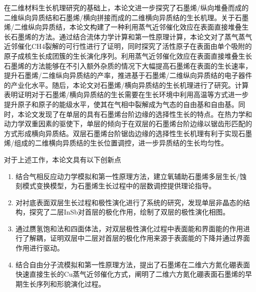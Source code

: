 在二维材料生长机理研究的基础上，本论文进一步探究了石墨烯/纵向堆叠而成的二维纵向异质结和石墨烯/横向拼接而成的二维横向异质结的生长机理。关于石墨烯/二维纵向异质结，本论文构建了一种利用蒸气近邻催化效应在表面直接堆叠生长石墨烯的方法。通过结合流体力学计算和第一性原理计算，本论文对了蒸气蒸气近邻催化CH4裂解的可行性进行了证明，同时探究了活性原子在表面由单个吸附的原子成核生长成团簇的生长演化序列。利用蒸气近邻催化效应在表面直接堆叠生长石墨烯的方法能够在不引入额外杂质的情况下大幅提高石墨烯在表面的生长速率，提升石墨烯/二维纵向异质结的产率，推进基于石墨烯/二维纵向异质结的电子器件的产业化水平。随后，本论文对石墨烯/横向异质结的生长机理进行了研究。计算表明证明对于石墨烯/横向异质结的生长需要在生长环境中利用高温等方式进一步提升原子和原子的能级水平，使其在气相中裂解成为气态的自由基和自由基。同时，本论文发现了在单层的具有石墨烯台阶边缘的选择性生长的特点。在热力学和动力学双重因素的驱使下，单层的倾向于在双层的石墨烯台阶边缘以锯齿形匹配的方式形成横向异质结。双层石墨烯台阶锯齿边缘的选择性生长机理有利于实现石墨烯/组成的二维横向异质结的生长位置调控，进一步异质结的生长均匀性。

对于上述工作，本论文具有以下创新点\chinesecolon
\begin{enumerate}[labelsep=0em,label=（\arabic*）,wide]
    \item 结合气相反应动力学模拟和第一性原理方法，建立氧辅助石墨烯多层生长/蚀刻模式变换模型，为石墨烯生长过程中的层数调控提供理论指导。
    \item 对衬底表面双层生长过程和极性演化进行了系统的研究，发现单层非晶态的结构，探究了二层InSb对首层的极化作用，绘制了双层的极性演化相图。
    \item 通过赝氢饱和法和四面体法，对双层极性演化过程中表面能和界面能的作用进行了解耦，证明双层中二层对首层的极化作用来源于表面能的下降并通过界面作用进行驱动。
    \item 结合自由分子流模拟和第一性原理方法，提出了石墨烯在二维六方氮化硼表面快速直接生长的Cu蒸气近邻催化方式，阐明了二维六方氮化硼表面石墨烯的早期生长序列和形貌演化过程。
\end{enumerate}
